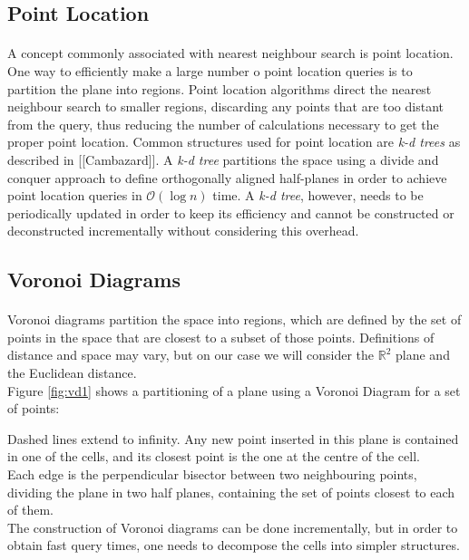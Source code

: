 \subsection{Point Location}
\paragraph{}
A concept commonly associated with nearest neighbour search is point location. 
One way to efficiently make a large number o point location queries is to partition the plane into regions. Point location algorithms direct the nearest neighbour search to smaller regions, discarding any points that are too distant from the query, thus reducing the number of calculations necessary to get the proper point location.
Common structures used for point location are \textit{k-d trees} as described in [[Cambazard]]. A \textit{k-d tree} partitions the space using a divide and conquer approach to define orthogonally aligned half-planes in order to achieve point location queries in $\mathcal{O}(\log{n})$ time. A \textit{k-d tree}, however, needs to be periodically updated in order to keep its efficiency and cannot be constructed or deconstructed incrementally without considering this overhead.
\subsection{Voronoi Diagrams}
\paragraph{}
Voronoi diagrams partition the space into regions, which are defined by the set of points in the space that are closest to a subset of those points. Definitions of distance and space may vary, but on our case we will consider the $\mathbb{R}^2$ plane and the Euclidean distance.\\
Figure \ref{fig:vd1} shows a partitioning of a plane using a Voronoi Diagram for a set of points:

\noindent
Dashed lines extend to infinity. Any new point inserted in this plane is contained in one of the cells, and its closest point is the one at the centre of the cell.\\
Each edge is the perpendicular bisector between two neighbouring points, dividing the plane in two half planes, containing the set of points closest to each of them.\\
The construction of Voronoi diagrams can be done incrementally, but in order to obtain fast query times, one needs to decompose the cells into simpler structures. 
